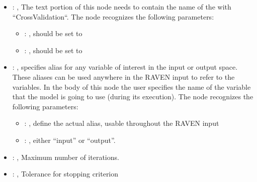 \begin{itemize}
\begin{itemize}
        \item {}: ,
          List of IDs of features/variables to include in the transformation process.

        \item {}: ,
          Which space to search? Target or Feature?
      \end{itemize}

    \item {}: ,
      The text portion of this node needs to contain the name of the  with
               ``CrossValidation``.
      The  node recognizes the following parameters:
        \begin{itemize}
          \item {}: ,
            should be set to 
          \item {}: ,
            should be set to 
      \end{itemize}

    \item {}: ,
      specifies alias for         any variable of interest in the input or output space. These
      aliases can be used anywhere in the RAVEN input to         refer to the variables. In the body
      of this node the user specifies the name of the variable that the model is going to use
      (during its execution).
      The  node recognizes the following parameters:
        \begin{itemize}
          \item {}: ,
            define the actual alias, usable throughout the RAVEN input
          \item {}: ,
            either ``input'' or ``output''.
      \end{itemize}

    \item {}: ,
      Maximum number of iterations.

    \item {}: ,
      Tolerance for stopping criterion


\end{itemize}
